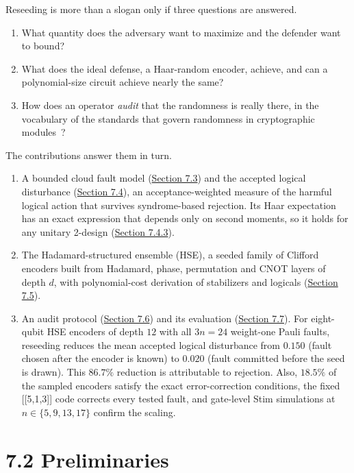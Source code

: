 \documentclass{report}
\theoremstyle{plain}
\theoremstyle{definition}
\theoremstyle{remark}
\begin{document}
Reseeding is more than a slogan only if three questions are answered.
\begin{enumerate}
  \item What quantity does the adversary want to maximize and the defender want to bound?
  \item What does the ideal defense, a Haar-random encoder, achieve, and can a polynomial-size circuit achieve nearly the same?
  \item How does an operator \emph{audit} that the randomness is really there, in the vocabulary of the standards that govern randomness in cryptographic modules~\cite{nist2015sp80090a,nist2019fips1403}?
\end{enumerate}
The contributions answer them in turn.
\begin{enumerate}
  \item A bounded cloud fault model (\hyperref[sec:qec:threat]{Section 7.3}) and the accepted logical disturbance (\hyperref[sec:qec:disturbance]{Section 7.4}), an acceptance-weighted measure of the harmful logical action that survives syndrome-based rejection. Its Haar expectation has an exact expression that depends only on second moments, so it holds for any unitary 2-design (\hyperref[sec:qec:haar]{Section 7.4.3}).
  \item The Hadamard-structured ensemble (HSE), a seeded family of Clifford encoders built from Hadamard, phase, permutation and CNOT layers of depth $d$, with polynomial-cost derivation of stabilizers and logicals (\hyperref[sec:qec:hse]{Section 7.5}).
  \item An audit protocol (\hyperref[sec:qec:protocol]{Section 7.6}) and its evaluation (\hyperref[sec:qec:experiments]{Section 7.7}). For eight-qubit HSE encoders of depth $12$ with all $3n=24$ weight-one Pauli faults, reseeding reduces the mean accepted logical disturbance from $0.150$ (fault chosen after the encoder is known) to $0.020$ (fault committed before the seed is drawn). This $86.7\%$ reduction is attributable to rejection. Also, $18.5\%$ of the sampled encoders satisfy the exact error-correction conditions, the fixed [[5,1,3]] code corrects every tested fault, and gate-level Stim simulations at $n\in\{5,9,13,17\}$ confirm the scaling.
\end{enumerate}

\section{7.2 Preliminaries}\label{sec:qec:prelim}
\end{document}
